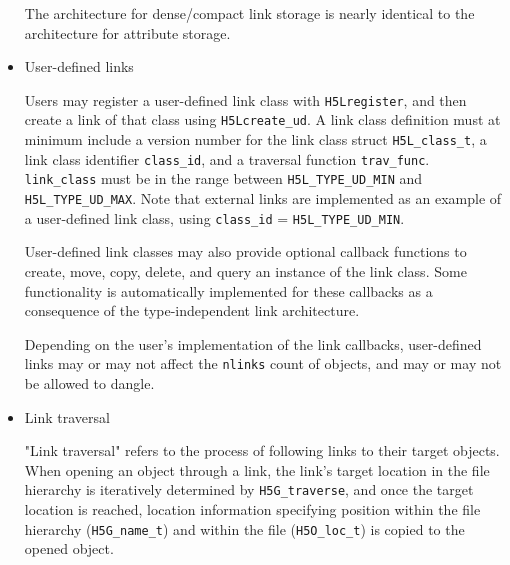 \begin{itemize}

The architecture for dense/compact link storage is nearly identical to the architecture for attribute storage.

    \item User-defined links

Users may register a user-defined link class with \texttt{H5Lregister}, and then create a link of that class using \texttt{H5Lcreate\_ud}. A link class definition must at minimum include a version number for the link class struct \texttt{H5L\_class\_t}, a link class identifier \texttt{class\_id}, and a traversal function \texttt{trav\_func}. \texttt{link\_class} must be in the range between \texttt{H5L\_TYPE\_UD\_MIN} and \texttt{H5L\_TYPE\_UD\_MAX}. Note that external links are implemented as an example of a user-defined link class, using \texttt{class\_id} = \texttt{H5L\_TYPE\_UD\_MIN}.

User-defined link classes may also provide optional callback functions to create, move, copy, delete, and query an instance of the link class. Some functionality is automatically implemented for these callbacks as a consequence of the type-independent link architecture. 

Depending on the user's implementation of the link callbacks, user-defined links may or may not affect the \texttt{nlinks} count of objects, and may or may not be allowed to dangle.

    \item Link traversal

"Link traversal" refers to the process of following links to their target objects. When opening an object through a link, the link's target location in the file hierarchy is iteratively determined by \texttt{H5G\_traverse}, and once the target location is reached, location information specifying position within the file hierarchy (\texttt{H5G\_name\_t}) and within the file (\texttt{H5O\_loc\_t}) is copied to the opened object.


\end{itemize}
